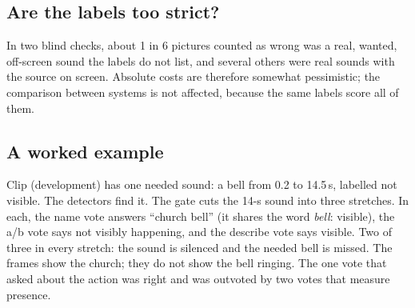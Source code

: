 \subsection{Are the labels too strict?}
In two blind checks, about 1 in 6 pictures counted as wrong was a real, wanted, off-screen sound the labels do not list,
and several others were real sounds with the source on screen. Absolute costs are therefore somewhat pessimistic; the
comparison between systems is not affected, because the same labels score all of them.

\subsection{A worked example}
Clip  (development) has one needed sound: a bell from 0.2 to 14.5\,s, labelled not visible. The detectors
find it. The gate cuts the 14-s sound into three stretches. In each, the name vote answers ``church bell'' (it shares the
word \emph{bell}: visible), the a/b vote says not visibly happening, and the describe vote says visible. Two of three in
every stretch: the sound is silenced and the needed bell is missed. The frames show the church; they do not show the bell
ringing. The one vote that asked about the action was right and was outvoted by two votes that measure presence.
